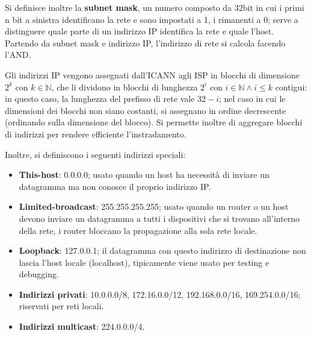 \documentclass[11pt, italian, openany]{book}
\begin{document}
\begin{sloppypar}
Si definisce inoltre la \textbf{subnet mask}, un numero composto da 32bit in cui i primi n bit a sinistra identificano la rete e sono impostati a 1,
i rimanenti a 0; serve a distinguere quale parte di un indirizzo IP identifica la rete e quale l'host. Partendo da subnet mask e indirizzo IP, l'indirizzo
di rete si calcola facendo l'AND.

Gli indirizzi IP vengono assegnati dall'ICANN agli ISP in blocchi di dimensione \(2^{k}\) con \( k \in \mathbb{N}\), che li dividono in blocchi di lunghezza
\(2^{i}\) con \(i \in \mathbb{N} \wedge i \leq k\) contigui: in questo caso, la lunghezza del prefisso di rete vale \( 32 - i \); nel caso in cui le dimensioni
dei blocchi non siano costanti, si assegnano in ordine decrescente (ordinando sulla dimensione del blocco). Si permette inoltre di aggregare blocchi di
indirizzi per rendere efficiente l'instradamento.

Inoltre, si definiscono i seguenti indirizzi speciali:
\begin{itemize}[itemsep=0pt, topsep=0pt, parsep=0pt]
	\item \textbf{This-host}: 0.0.0.0; usato quando un host ha necessit\`a di inviare un datagramma ma non conosce il proprio indirizzo IP.
	\item \textbf{Limited-broadcast}: 255.255.255.255; usato quando un router o un host devono inviare un datagramma a tutti i dispositivi che si trovano
	all’interno della rete, i router bloccano la propagazione alla sola rete locale.
	\item \textbf{Loopback}: 127.0.0.1; il datagramma con questo indirizzo di destinazione non lascia l’host locale (localhost), tipicamente viene usato per
	testing e debugging.
	\item \textbf{Indirizzi privati}: 10.0.0.0/8, 172.16.0.0/12, 192.168.0.0/16, 169.254.0.0/16; riservati per reti locali.
	\item \textbf{Indirizzi multicast}: 224.0.0.0/4.
\end{itemize}


\end{sloppypar}
\end{document}
